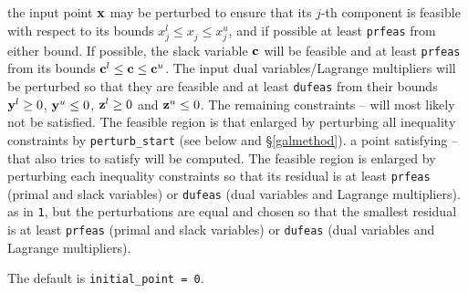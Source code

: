 \documentclass{galahad}
\begin{document}
\begin{description}
\begin{description}
 the input point ${\mathbf{x}}$ may be perturbed to ensure that its $j$-th
component is feasible with respect to its
bounds $x_{j}^{l}  \leq  x_{j}^{ } \leq  x_{j}^{u}$, and
if possible at least {\tt prfeas} from either bound. If possible, 
the slack variable ${\mathbf{c}}$ will be feasible and at least {\tt prfeas} from 
its bounds ${\mathbf{c}}^{l} \leq {\mathbf{c}} \leq {\mathbf{c}}^{u}$.
The input dual variables/Lagrange multipliers will be perturbed so that they 
are feasible and at least 
{\tt dufeas} from their bounds  ${\mathbf{y}}^{l} \geq 0$, ${\mathbf{y}}^{u} \leq 0$,
${\mathbf{z}}^{l} \geq 0$ and  ${\mathbf{z}}^{u} \leq 0$. The remaining constraints
-- will most likely not be satisfied. The feasible region
is that enlarged by perturbing all inequality constraints by 
{\tt perturb\_start} (see below and \S\ref{galmethod}).
 a point satisfying -- that also tries to satisfy
 will be computed. The feasible region is enlarged by perturbing
each inequality constraints so that its residual is at least
{\tt prfeas} (primal and slack variables) or
{\tt dufeas} (dual variables and Lagrange multipliers).
 as in {\tt 1}, but the perturbations are equal and chosen so that
the smallest residual is at least {\tt prfeas} (primal and slack variables) or
{\tt dufeas} (dual variables and Lagrange multipliers).
\end{description}
The default is {\tt initial\_point = 0}.






\end{description}
\end{document}
